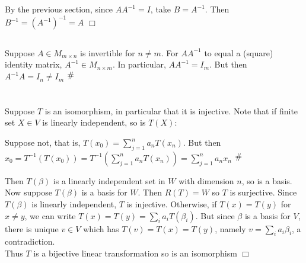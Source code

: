 \documentclass{article}
\newcommand{\contra}{\raisebox{\depth}{\#}}
\newenvironment{myindentpar}[1]
  {\begin{list}{}
          {\setlength{\leftmargin}{#1}}
          \item[]
  }
  {\end{list}}
\begin{document}
\subsection{}
By the previous section, since $AA^{-1} = I$, take $B = A^{-1}$. Then $B^{-1} = \left(A^{-1}\right)^{-1} = A$ $\Box$

\subsection{}
Suppose $A \in M_{m\times n}$ is invertible for $n \neq m$. For $AA^{-1}$ to equal a (square) identity matrix, $A^{-1} \in M_{n \times m}$. In particular, $AA^{-1} = I_m$. But then $A^{-1}A = I_n \neq I_m$ $\contra$

\section{}
Suppose $T$ is an isomorphism, in particular that it is injective. Note that if finite set $X \in V$ is linearly independent, so is $T(X)$:
\begin{myindentpar}{2em}
    Suppose not, that is, $T(x_0) = \sum\limits_{j = 1}^n a_n T(x_n)$. But then $x_0 = T^{-1} (T(x_0)) = T^{-1} (\sum\limits_{j = 1}^n a_n T(x_n)) = \sum\limits_{j=1}^n a_n x_n$ $\contra$
\end{myindentpar}
Then $T(\beta)$ is a linearly independent set in $W$ with dimension $n$, so is a basis.\\
Now suppose $T(\beta)$ is a basis for $W$.
Then $R(T) = W$ so $T$ is surjective. Since $T(\beta)$ is linearly independent, $T$ is injective. Otherwise, if $T(x) = T(y)$ for $x \neq y$, we can write $T(x) = T(y) = \sum\limits_i a_i T(\beta_i)$. But since $\beta$ is a basis for $V$, there is unique $v \in V$ which has $T(v) = T(x) = T(y)$, namely $v = \sum\limits_i a_i \beta_i$, a contradiction.\\
Thus $T$ is a bijective linear transformation so is an isomorphism $\Box$
\end{document}
